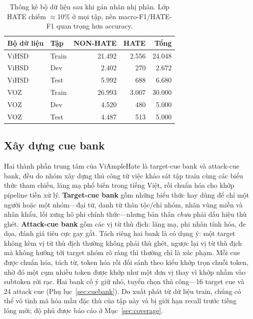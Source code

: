 \documentclass[11pt]{article}
\begin{document}
\begin{table}[tbp]
  \centering
  \small
  \setlength{\tabcolsep}{3pt}
  \begin{tabular}{llrrr}
    \toprule
    \textbf{Bộ dữ liệu} & \textbf{Tập} & \textbf{NON-HATE} & \textbf{HATE} & \textbf{Tổng} \\
    \midrule
    ViHSD & Train & 21{.}492 & 2{.}556 & 24{.}048 \\
    ViHSD & Dev   & 2{.}402  & 270     & 2{.}672  \\
    ViHSD & Test  & 5{.}992  & 688     & 6{.}680  \\
    VOZ   & Train & 26{.}993 & 3{.}007 & 30{.}000 \\
    VOZ   & Dev   & 4{.}520  & 480     & 5{.}000  \\
    VOZ   & Test  & 4{.}487  & 513     & 5{.}000  \\
    \bottomrule
  \end{tabular}
  \caption{Thống kê bộ dữ liệu sau khi gán nhãn nhị phân. Lớp HATE chiếm $\approx$10\% ở mọi tập, nên macro-F1/HATE-F1 quan trọng hơn accuracy.}
  \label{tab:data}
\end{table}

\subsection{Xây dựng cue bank}
\label{sec:cue}
Hai thành phần trung tâm của ViAmpleHate là target-cue bank và attack-cue bank, đều do nhóm xây dựng thủ công từ việc khảo sát tập train cùng các biểu thức tham chiếu, lăng mạ phổ biến trong tiếng Việt, rồi chuẩn hóa cho khớp pipeline tiền xử lý. \textbf{Target-cue bank} gồm những biểu thức hay dùng để chỉ một người hoặc một nhóm---đại từ, danh từ thân tộc/chỉ nhóm, nhãn vùng miền và nhân khẩu, lối xưng hô phi chính thức---nhưng bản thân \emph{chưa} phải dấu hiệu thù ghét. \textbf{Attack-cue bank} gồm các vị từ thù địch: lăng mạ, phi nhân tính hóa, đe dọa, đánh giá tiêu cực gay gắt. Tách riêng hai bank là có dụng ý: một target không kèm vị từ thù địch thường không phải thù ghét, ngược lại vị từ thù địch mà không hướng tới target nhóm rõ ràng thì thường chỉ là xúc phạm. Mỗi cue được chuẩn hóa, tách từ, token hóa rồi đối sánh theo kiểu khớp trọn chuỗi token, nhờ đó một cụm nhiều token được khớp như một đơn vị thay vì khớp nhầm vào subtoken rời rạc. Hai bank cố ý giữ nhỏ, tuyển chọn thủ công---16 target cue và 24 attack cue (Phụ lục~\ref{sec:cuebank}). Do xuất phát từ dữ liệu train, chúng có thể vô tình mã hóa mẫu đặc thù của tập này và bị giới hạn recall trước tiếng lóng mới; độ phủ được báo cáo ở Mục~\ref{sec:coverage}.
\end{document}
